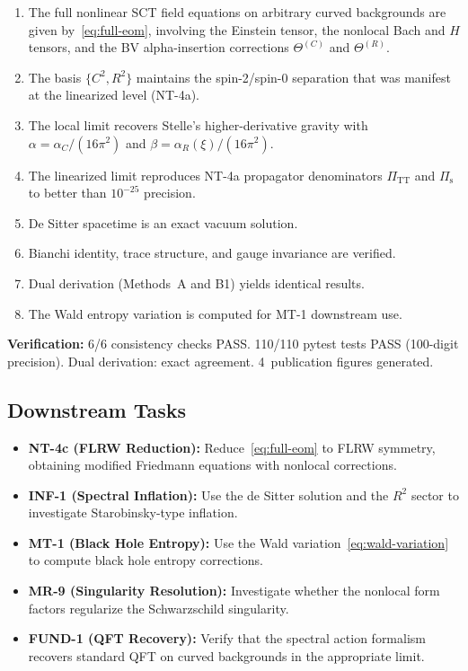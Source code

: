 \documentclass[11pt,a4paper]{article}
\theoremstyle{plain}
\theoremstyle{definition}
\begin{document}
\begin{tcolorbox}[colback=blue!5!white, colframe=blue!50!black,
  title={\textbf{NT-4b Main Results}}]
\begin{enumerate}[nosep]
  \item The full nonlinear SCT field equations on arbitrary curved
    backgrounds are given by~\eqref{eq:full-eom}, involving the
    Einstein tensor, the nonlocal Bach and $H$ tensors, and the BV
    alpha-insertion corrections $\Theta^{(C)}$ and $\Theta^{(R)}$.
  \item The basis $\{C^2, R^2\}$ maintains the spin-2/spin-0 separation
    that was manifest at the linearized level (NT-4a).
  \item The local limit recovers Stelle's higher-derivative gravity
    with $\alpha = \alpha_C/(16\pi^2)$ and $\beta = \alpha_R(\xi)/(16\pi^2)$.
  \item The linearized limit reproduces NT-4a propagator denominators
    $\Pi_{\mathrm{TT}}$ and $\Pi_{\mathrm{s}}$ to better than $10^{-25}$
    precision.
  \item De Sitter spacetime is an exact vacuum solution.
  \item Bianchi identity, trace structure, and gauge invariance are verified.
  \item Dual derivation (Methods~A and B1) yields identical results.
  \item The Wald entropy variation is computed for MT-1 downstream use.
\end{enumerate}

\medskip
\noindent\textbf{Verification:} 6/6 consistency checks PASS.
110/110 pytest tests PASS (100-digit precision).
Dual derivation: exact agreement.
4~publication figures generated.
\end{tcolorbox}

\subsection{Downstream Tasks}

\begin{itemize}[nosep]
  \item \textbf{NT-4c (FLRW Reduction):} Reduce~\eqref{eq:full-eom}
    to FLRW symmetry, obtaining modified Friedmann equations with
    nonlocal corrections.
  \item \textbf{INF-1 (Spectral Inflation):} Use the de Sitter solution
    and the $R^2$ sector to investigate Starobinsky-type inflation.
  \item \textbf{MT-1 (Black Hole Entropy):} Use the Wald
    variation~\eqref{eq:wald-variation} to compute black hole entropy
    corrections.
  \item \textbf{MR-9 (Singularity Resolution):} Investigate whether the
    nonlocal form factors regularize the Schwarzschild singularity.
  \item \textbf{FUND-1 (QFT Recovery):} Verify that the spectral action
    formalism recovers standard QFT on curved backgrounds in the
    appropriate limit.
\end{itemize}
\end{document}

